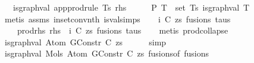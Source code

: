 \begin{isabellebody}
\ \ \ {\isachardoublequoteopen}is{\isacharunderscore}{\kern0pt}graph{\isacharunderscore}{\kern0pt}val\ {\isacharparenleft}{\kern0pt}app{\isacharunderscore}{\kern0pt}prodrule\ Ts\ rhs{\isacharparenright}{\kern0pt}{\isachardoublequoteclose}\isanewline
%
\isadelimproof
%
\endisadelimproof
%
\isatagproof
{}\isamarkupfalse%
\ {\isacharminus}{\kern0pt}\isanewline
\ \ \isamarkupfalse%
\ P{}{\isacharcolon}{\kern0pt}\ {\isachardoublequoteopen}{\isasymforall}T\ {\isasymin}\ set\ Ts{\isachardot}{\kern0pt}\ is{\isacharunderscore}{\kern0pt}graph{\isacharunderscore}{\kern0pt}val\ T{\isachardoublequoteclose}\isanewline
\ \ \ \ \isamarkupfalse%
\ {\isacharparenleft}{\kern0pt}metis\ assms\ in{\isacharunderscore}{\kern0pt}set{\isacharunderscore}{\kern0pt}conv{\isacharunderscore}{\kern0pt}nth\ is{\isacharunderscore}{\kern0pt}val{\isachardot}{\kern0pt}simps{\isacharparenleft}{\kern0pt}{}{\isacharparenright}{\kern0pt}{\isacharparenright}{\kern0pt}\isanewline
\isanewline
\ \ \isamarkupfalse%
\ i\ C\ zs\ fusions\ taus\ \isanewline
\ \ \ \ prod{\isacharunderscore}{\kern0pt}rhs{\isacharcolon}{\kern0pt}\ {\isachardoublequoteopen}rhs\ {\isacharequal}{\kern0pt}\ {\isacharparenleft}{\kern0pt}i{\isacharcomma}{\kern0pt}\ {\isacharparenleft}{\kern0pt}C{\isacharcomma}{\kern0pt}\ zs{\isacharparenright}{\kern0pt}{\isacharcomma}{\kern0pt}\ fusions{\isacharcomma}{\kern0pt}\ taus{\isacharparenright}{\kern0pt}{\isachardoublequoteclose}\isanewline
\ \ \isamarkupfalse%
\ {\isacharparenleft}{\kern0pt}metis\ prod{\isachardot}{\kern0pt}collapse{\isacharparenright}{\kern0pt}\isanewline
\isanewline
\ \ \isamarkupfalse%
\ {\isachardoublequoteopen}is{\isacharunderscore}{\kern0pt}graph{\isacharunderscore}{\kern0pt}val\ {\isacharparenleft}{\kern0pt}Atom\ {\isacharparenleft}{\kern0pt}GConstr\ C{\isacharparenright}{\kern0pt}\ zs{\isacharparenright}{\kern0pt}{\isachardoublequoteclose}\isanewline
\ \ \ \ \isamarkupfalse%
\ simp\isanewline
\isanewline
\ \ \isamarkupfalse%
\ \isamarkupfalse%
\ {\isachardoublequoteopen}is{\isacharunderscore}{\kern0pt}graph{\isacharunderscore}{\kern0pt}val\ {\isacharparenleft}{\kern0pt}Mols{}\ {\isacharparenleft}{\kern0pt}Atom\ {\isacharparenleft}{\kern0pt}GConstr\ C{\isacharparenright}{\kern0pt}\ zs{\isacharparenright}{\kern0pt}\ {\isacharparenleft}{\kern0pt}fusions{\isacharunderscore}{\kern0pt}of\ fusions{\isacharparenright}{\kern0pt}{\isacharparenright}{\kern0pt}{\isachardoublequoteclose}\isanewline

\end{isabellebody}
